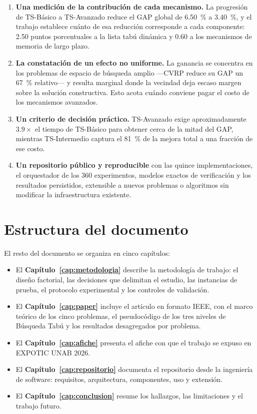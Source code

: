 \begin{enumerate}
  \item \textbf{Una medición de la contribución de cada mecanismo.} La progresión de
    TS-Básico a TS-Avanzado reduce el GAP global de \SI{6.50}{\percent} a
    \SI{3.40}{\percent}, y el trabajo establece cuánto de esa reducción
    corresponde a cada componente: 2.50 puntos porcentuales a la lista tabú
    dinámica y 0.60 a los mecanismos de memoria de largo plazo.
  \item \textbf{La constatación de un efecto no uniforme.} La ganancia
    se concentra en los problemas de espacio de búsqueda amplio —CVRP reduce
    su GAP un \SI{67}{\percent} relativo— y resulta marginal donde la
    vecindad deja escaso margen sobre la solución constructiva. Esto acota
    cuándo conviene pagar el costo de los mecanismos avanzados.
  \item \textbf{Un criterio de decisión práctico.} TS-Avanzado exige
    aproximadamente $3.9\times$ el tiempo de TS-Básico para obtener cerca de
    la mitad del GAP, mientras TS-Intermedio captura el \SI{81}{\percent} de la mejora
    total a una fracción de ese costo.
  \item \textbf{Un repositorio público y reproducible} con las quince
    implementaciones, el orquestador de los 360 experimentos, modelos exactos
    de verificación y los resultados persistidos, extensible a nuevos
    problemas o algoritmos sin modificar la infraestructura existente.
\end{enumerate}

\section{Estructura del documento}
\label{sec:estructura}

El resto del documento se organiza en cinco capítulos:

\begin{itemize}
  \item El \textbf{Capítulo~\ref{cap:metodologia}} describe la metodología
    de trabajo: el diseño factorial, las decisiones que delimitan el
    estudio, las instancias de prueba, el protocolo experimental y los
    controles de validación.
  \item El \textbf{Capítulo~\ref{cap:paper}} incluye el artículo en formato
    IEEE, con el marco teórico de los cinco problemas, el pseudocódigo de
    los tres niveles de Búsqueda Tabú y los resultados desagregados por
    problema.
  \item El \textbf{Capítulo~\ref{cap:afiche}} presenta el afiche con que el
    trabajo se expuso en EXPOTIC UNAB 2026.
  \item El \textbf{Capítulo~\ref{cap:repositorio}} documenta el repositorio
    desde la ingeniería de software: requisitos, arquitectura, componentes,
    uso y extensión.
  \item El \textbf{Capítulo~\ref{cap:conclusion}} resume los hallazgos, las
    limitaciones y el trabajo futuro.
\end{itemize}
